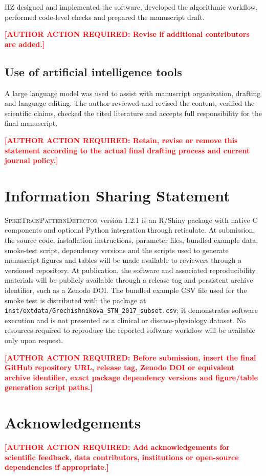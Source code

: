 \documentclass[pdflatex,sn-apa]{sn-jnl}
\newcommand{\stpd}{\textsc{SpikeTrainPatternDetector}}
\newcommand{\TODONOTE}[1]{\par\medskip\noindent\textbf{\textcolor{red}{[AUTHOR ACTION REQUIRED: #1]}}\par\medskip}
\begin{document}
HZ designed and implemented the software, developed the algorithmic workflow, performed code-level checks and prepared the manuscript draft. \TODONOTE{Revise if additional contributors are added.}

\subsection*{Use of artificial intelligence tools}

A large language model was used to assist with manuscript organization, drafting and language editing. The author reviewed and revised the content, verified the scientific claims, checked the cited literature and accepts full responsibility for the final manuscript. \TODONOTE{Retain, revise or remove this statement according to the actual final drafting process and current journal policy.}

\section*{Information Sharing Statement}

\stpd{} version 1.2.1 is an R/Shiny package with native C components and optional Python integration through reticulate. At submission, the source code, installation instructions, parameter files, bundled example data, smoke-test script, dependency versions and the scripts used to generate manuscript figures and tables will be made available to reviewers through a versioned repository. At publication, the software and associated reproducibility materials will be publicly available through a release tag and persistent archive identifier, such as a Zenodo DOI. The bundled example CSV file used for the smoke test is distributed with the package at \texttt{inst/extdata/Grechishnikova\_STN\_2017\_subset.csv}; it demonstrates software execution and is not presented as a clinical or disease-physiology dataset. No resources required to reproduce the reported software workflow will be available only upon request.

\TODONOTE{Before submission, insert the final GitHub repository URL, release tag, Zenodo DOI or equivalent archive identifier, exact package dependency versions and figure/table generation script paths.}

\section*{Acknowledgements}

\TODONOTE{Add acknowledgements for scientific feedback, data contributors, institutions or open-source dependencies if appropriate.}


\end{document}
